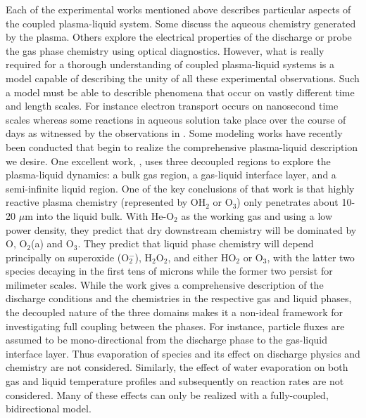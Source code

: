 Each of the experimental works mentioned above describes particular aspects of the coupled plasma-liquid system. Some discuss the aqueous chemistry generated by the plasma. Others explore the electrical properties of the discharge or probe the gas phase chemistry using optical diagnostics. However, what is really required for a thorough understanding of coupled plasma-liquid systems is a model capable of describing the unity of all these experimental observations. Such a model must be able to describle phenomena that occur on vastly different time and length scales. For instance electron transport occurs on nanosecond time scales whereas some reactions in aqueous solution take place over the course of days as witnessed by the observations in \cite{Traylor2011h}. Some modeling works have recently been conducted that begin to realize the comprehensive plasma-liquid description we desire. One excellent work, \cite{Chen2014a}, uses three decoupled regions to explore the plasma-liquid dynamics: a bulk gas region, a gas-liquid interface layer, and a semi-infinite liquid region. One of the key conclusions of that work is that highly reactive plasma chemistry (represented by OH$_2$ or O$_3$) only penetrates about 10-20 $\mu$m into the liquid bulk. With He-O$_2$ as the working gas and using a low power density, they predict that dry downstream chemistry will be dominated by O, O$_2$(a) and O$_3$. They predict that liquid phase chemistry will depend principally on superoxide (O$_2^-$), H$_2$O$_2$, and either HO$_2$ or O$_3$, with the latter two species decaying in the first tens of microns while the former two persist for milimeter scales. While the work gives a comprehensive description of the discharge conditions and the chemistries in the respective gas and liquid phases, the decoupled nature of the three domains makes it a non-ideal framework for investigating full coupling between the phases. For instance, particle fluxes are assumed to be mono-directional from the discharge phase to the gas-liquid interface layer. Thus evaporation of species and its effect on discharge physics and chemistry are not considered. Similarly, the effect of water evaporation on both gas and liquid temperature profiles and subsequently on reaction rates are not considered. Many of these effects can only be realized with a fully-coupled, bidirectional model.

